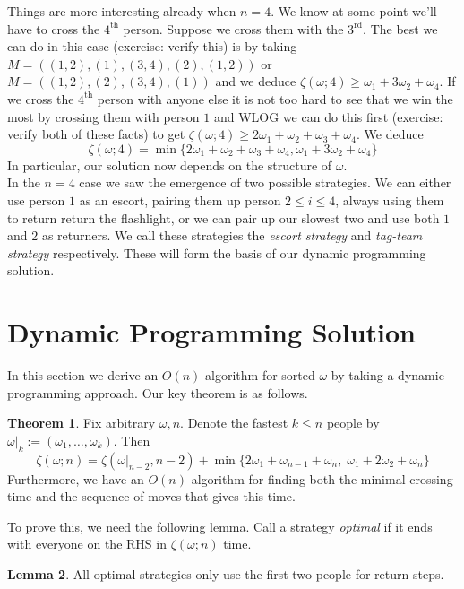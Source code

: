 \documentclass[11pt]{article}
\theoremstyle{definition}
\newtheorem{theorem}{Theorem}[section]
\newtheorem{lemma}[theorem]{Lemma}
\begin{document}
Things are more interesting already when $n = 4$. We know at some point we'll have to cross the $4^\text{th}$ person. 
Suppose we cross them with the $3^\text{rd}$. The best we can do in this case (exercise: verify this) is by taking 
$M = ((1,2), (1), (3,4), (2), (1,2))$ or $M = ((1,2), (2), (3,4), (1))$ and we deduce $\zeta(\omega ; 4) \geq \omega_1 
+ 3\omega_2 + \omega_4$. If we cross the $4^\text{th}$ person with anyone else it is not too hard to see that we win 
the most by crossing them with person $1$ and WLOG we can do this first (exercise: verify both of these facts) to get 
$\zeta(\omega ; 4) \geq 2\omega_1 + \omega_2 +  \omega_3 + \omega_4$. We deduce 
\[\zeta(\omega; 4) = \min\{2\omega_1 + \omega_2 + \omega_3 + \omega_4, \omega_1 + 3\omega_2 + \omega_4\}\]
In particular, our solution now depends on the structure of $\omega$. \\ 

In the $n = 4$ case we saw the emergence of two possible strategies. We can either use person $1$ as an escort, 
pairing them up person $2 \leq i \leq 4$, always using them to return return the flashlight, or we can pair up our 
slowest two and use both $1$ and $2$ as returners. We call these strategies the {\it escort strategy} and 
{\it tag-team strategy} respectively. These will form the basis of our dynamic programming solution.

\section{Dynamic Programming Solution}

In this section we derive an $O(n)$ algorithm for sorted $\omega$ by taking a dynamic programming approach. Our 
key theorem is as follows. 

\begin{theorem}
    Fix arbitrary $\omega, n$. Denote the fastest $k \leq n$ people by $\omega \vert_{k} := (\omega_1, \dots, \omega_k)$. Then
    \[\zeta(\omega ; n) = \zeta(\omega \vert_{n-2}, n-2) + \min\{2\omega_1 + \omega_{n-1} + \omega_n, \; \omega_1 + 2 \omega_2 + 
    \omega_n\}\]
    Furthermore, we have an $O(n)$ algorithm for finding both the minimal crossing time and the sequence of moves 
    that gives this time. 
\end{theorem}

To prove this, we need the following lemma. Call a strategy {\it optimal} if it ends with everyone on the RHS in 
$\zeta(\omega ; n)$ time. 

\begin{lemma}
    All optimal strategies only use the first two people for return steps. 
\end{lemma}
\end{document}

